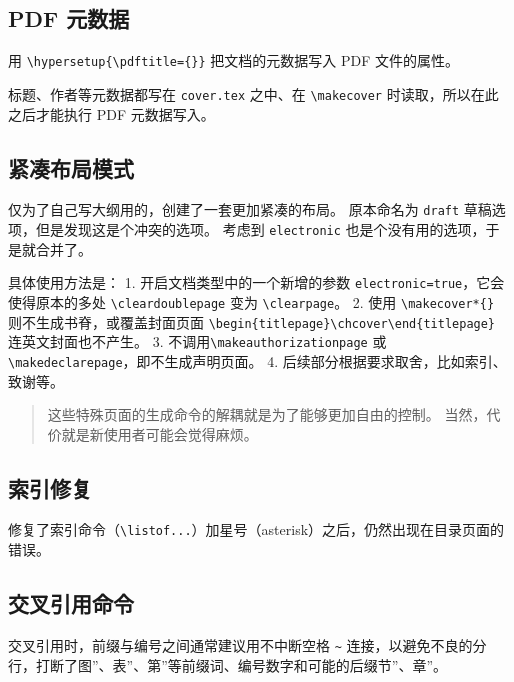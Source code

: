 \documentclass[../Main/thesis.tex]{subfiles}
\begin{document}
\subsection{PDF 元数据}

用 \texttt{\textbackslash{}hypersetup\{\textbackslash{}pdftitle=\{\}\}}
把文档的元数据写入 PDF 文件的属性。

标题、作者等元数据都写在 \texttt{cover.tex} 之中、在
\texttt{\textbackslash{}makecover} 时读取，所以在此之后才能执行 PDF
元数据写入。

\subsection{紧凑布局模式}

仅为了自己写大纲用的，创建了一套更加紧凑的布局。 原本命名为
\texttt{draft} 草稿选项，但是发现这是个冲突的选项。 考虑到
\texttt{electronic} 也是个没有用的选项，于是就合并了。

具体使用方法是： 1. 开启文档类型中的一个新增的参数
\texttt{electronic=true}，它会使得原本的多处
\texttt{\textbackslash{}cleardoublepage} 变为
\texttt{\textbackslash{}clearpage}。 2. 使用
\texttt{\textbackslash{}makecover*\{\}} 则不生成书脊，或覆盖封面页面
\texttt{\textbackslash{}begin\{titlepage\}\textbackslash{}chcover\textbackslash{}end\{titlepage\}}
连英文封面也不产生。 3.
不调用\texttt{\textbackslash{}makeauthorizationpage} 或
\texttt{\textbackslash{}makedeclarepage}，即不生成声明页面。 4.
后续部分根据要求取舍，比如索引、致谢等。

\begin{quote}
这些特殊页面的生成命令的解耦就是为了能够更加自由的控制。
当然，代价就是新使用者可能会觉得麻烦。
\end{quote}

\subsection{索引修复}

修复了索引命令（\texttt{\textbackslash{}listof...}）加星号（asterisk）之后，仍然出现在目录页面的错误。

\subsection{交叉引用命令}

交叉引用时，前缀与编号之间通常建议用不中断空格
\texttt{\textasciitilde{}}
连接，以避免不良的分行，打断了图''、表''、第''等前缀词、编号数字和可能的后缀节''、章''。
\end{document}

